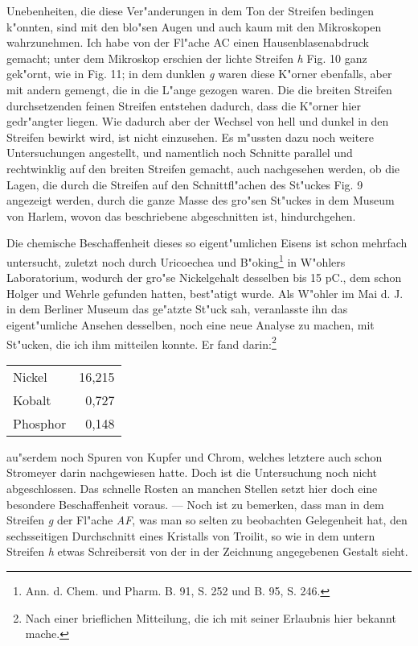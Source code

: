 \documentclass[a4paper, 11pt, oneside, german]{article}
\begin{document}
Unebenheiten, die diese Ver"anderungen in dem Ton der Streifen bedingen k"onnten, sind mit den blo"sen Augen und auch kaum mit den Mikroskopen wahrzunehmen. Ich habe von der Fl"ache AC einen Hausenblasenabdruck gemacht; unter dem Mikroskop erschien der lichte Streifen \emph{h} Fig. 10 ganz gek"ornt, wie in Fig. 11; in dem dunklen \emph{g} waren diese K"orner ebenfalls, aber mit andern gemengt, die in die L"ange gezogen waren. Die die breiten Streifen durchsetzenden feinen Streifen entstehen dadurch, dass die K"orner hier gedr"angter liegen. Wie dadurch aber der Wechsel von hell und dunkel in den Streifen bewirkt wird, ist nicht einzusehen. Es m"ussten dazu noch weitere Untersuchungen angestellt, und namentlich noch Schnitte parallel und rechtwinklig auf den breiten Streifen gemacht, auch nachgesehen werden, ob die Lagen, die durch die Streifen auf den Schnittfl"achen des St"uckes Fig. 9 angezeigt werden, durch die ganze Masse des gro"sen St"uckes in dem Museum von Harlem, wovon das beschriebene abgeschnitten ist, hindurchgehen.

Die chemische Beschaffenheit dieses so eigent"umlichen Eisens ist schon mehrfach untersucht, zuletzt noch durch Uricoechea und B"oking\footnote{Ann. d. Chem. und Pharm. B. 91, S. 252 und B. 95, S. 246.} in W"ohlers Laboratorium, wodurch der gro"se Nickelgehalt desselben bis 15 pC., dem schon Holger und Wehrle gefunden hatten, best"atigt wurde. Als W"ohler im Mai d. J. in dem Berliner Museum das ge"atzte St"uck sah, veranlasste ihn das eigent"umliche Ansehen desselben, noch eine neue Analyse zu machen, mit St"ucken, die ich ihm mitteilen konnte. Er fand darin:\footnote{Nach einer brieflichen Mitteilung, die ich mit seiner Erlaubnis hier bekannt mache.}
\begin{center}
\begin{tabular}{ l r }
    Nickel & 16,215\\
    Kobalt & 0,727\\
    Phosphor & 0,148\\
\end{tabular}
\end{center}
au"serdem noch Spuren von Kupfer und Chrom, welches letztere auch schon Stromeyer darin nachgewiesen hatte. Doch ist die Untersuchung noch nicht abgeschlossen. Das schnelle Rosten an manchen Stellen setzt hier doch eine besondere Beschaffenheit voraus. --- Noch ist zu bemerken, dass man in dem Streifen \emph{g} der Fl"ache \emph{AF}, was man so selten zu beobachten Gelegenheit hat, den sechsseitigen Durchschnitt eines Kristalls von Troilit, so wie in dem untern Streifen \emph{h} etwas Schreibersit von der in der Zeichnung angegebenen Gestalt sieht.
\end{document}
